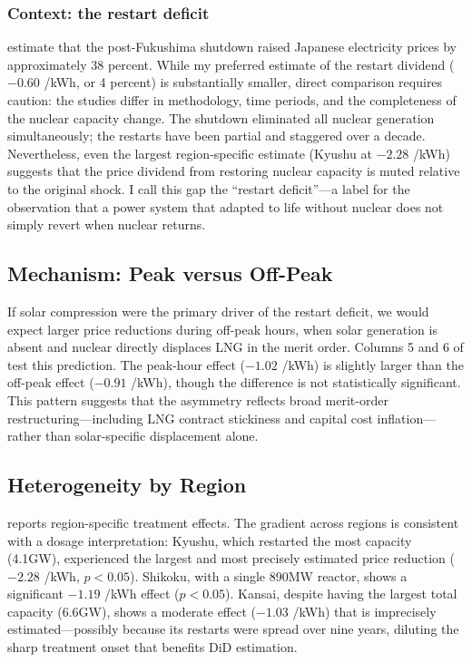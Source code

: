 \documentclass[12pt]{article}
\newcommand{\yen}{\textyen}
\begin{document}
\subsubsection*{Context: the restart deficit} \citet{Neidell2021} estimate that the post-Fukushima shutdown raised Japanese electricity prices by approximately 38 percent. While my preferred estimate of the restart dividend ($-0.60$ \yen/kWh, or 4 percent) is substantially smaller, direct comparison requires caution: the studies differ in methodology, time periods, and the completeness of the nuclear capacity change. The shutdown eliminated all nuclear generation simultaneously; the restarts have been partial and staggered over a decade. Nevertheless, even the largest region-specific estimate (Kyushu at $-2.28$ \yen/kWh) suggests that the price dividend from restoring nuclear capacity is muted relative to the original shock. I call this gap the ``restart deficit''---a label for the observation that a power system that adapted to life without nuclear does not simply revert when nuclear returns.



\subsection{Mechanism: Peak versus Off-Peak}

If solar compression were the primary driver of the restart deficit, we would expect larger price reductions during off-peak hours, when solar generation is absent and nuclear directly displaces LNG in the merit order. Columns 5 and 6 of  test this prediction. The peak-hour effect ($-1.02$ \yen/kWh) is slightly larger than the off-peak effect ($-0.91$ \yen/kWh), though the difference is not statistically significant. This pattern suggests that the asymmetry reflects broad merit-order restructuring---including LNG contract stickiness and capital cost inflation---rather than solar-specific displacement alone.

\subsection{Heterogeneity by Region}

 reports region-specific treatment effects. The gradient across regions is consistent with a dosage interpretation: Kyushu, which restarted the most capacity (4.1GW), experienced the largest and most precisely estimated price reduction ($-2.28$ \yen/kWh, $p<0.05$). Shikoku, with a single 890MW reactor, shows a significant $-1.19$ \yen/kWh effect ($p<0.05$). Kansai, despite having the largest total capacity (6.6GW), shows a moderate effect ($-1.03$ \yen/kWh) that is imprecisely estimated---possibly because its restarts were spread over nine years, diluting the sharp treatment onset that benefits DiD estimation.
\end{document}
